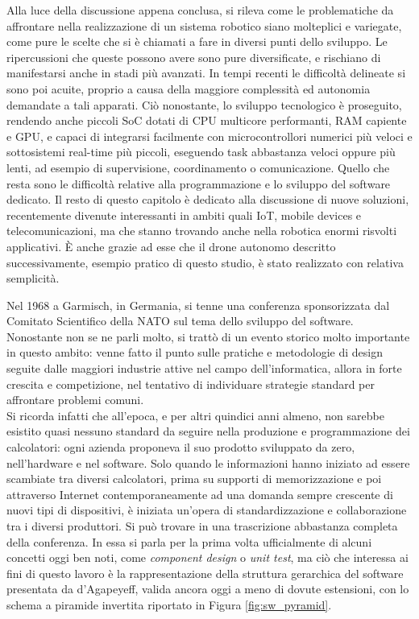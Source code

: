 \indent Alla luce della discussione appena conclusa, si rileva come le problematiche da affrontare nella realizzazione di un sistema robotico siano molteplici e variegate, come pure le scelte che si è chiamati a fare in diversi punti dello sviluppo. Le ripercussioni che queste possono avere sono pure diversificate, e rischiano di manifestarsi anche in stadi più avanzati. In tempi recenti le difficoltà delineate si sono poi acuite, proprio a causa della maggiore complessità ed autonomia demandate a tali apparati. Ciò nonostante, lo sviluppo tecnologico è proseguito, rendendo anche piccoli SoC dotati di CPU multicore performanti, RAM capiente e GPU, e capaci di integrarsi facilmente con microcontrollori numerici più veloci e sottosistemi real-time più piccoli, eseguendo task abbastanza veloci oppure più lenti, ad esempio di supervisione, coordinamento o comunicazione. Quello che resta sono le difficoltà relative alla programmazione e lo sviluppo del software dedicato.\newpage
Il resto di questo capitolo è dedicato alla discussione di nuove soluzioni, recentemente divenute interessanti in ambiti quali IoT, mobile devices e telecomunicazioni, ma che stanno trovando anche nella robotica enormi risvolti applicativi. È anche grazie ad esse che il drone autonomo descritto successivamente, esempio pratico di questo studio, è stato realizzato con relativa semplicità.

\indent Nel 1968 a Garmisch, in Germania, si tenne una conferenza sponsorizzata dal Comitato Scientifico della NATO sul tema dello sviluppo del software. Nonostante non se ne parli molto, si trattò di un evento storico molto importante in questo ambito: venne fatto il punto sulle pratiche e metodologie di design seguite dalle maggiori industrie attive nel campo dell'informatica, allora in forte crescita e competizione, nel tentativo di individuare strategie standard per affrontare problemi comuni.\\
Si ricorda infatti che all'epoca, e per altri quindici anni almeno, non sarebbe esistito quasi nessuno standard da seguire nella produzione e programmazione dei calcolatori: ogni azienda proponeva il suo prodotto sviluppato da zero, nell'hardware e nel software. Solo quando le informazioni hanno iniziato ad essere scambiate tra diversi calcolatori, prima su supporti di memorizzazione e poi attraverso Internet contemporaneamente ad una domanda sempre crescente di nuovi tipi di dispositivi, è iniziata un'opera di standardizzazione e collaborazione tra i diversi produttori.\newpage
Si può trovare in \cite{middleware} una trascrizione abbastanza completa della conferenza. In essa si parla per la prima volta ufficialmente di alcuni concetti oggi ben noti, come \emph{component design} o \emph{unit test}, ma ciò che interessa ai fini di questo lavoro è la rappresentazione della struttura gerarchica del software presentata da d’Agapeyeff, valida ancora oggi a meno di dovute estensioni, con lo schema a piramide invertita riportato in Figura \ref{fig:sw_pyramid}.

